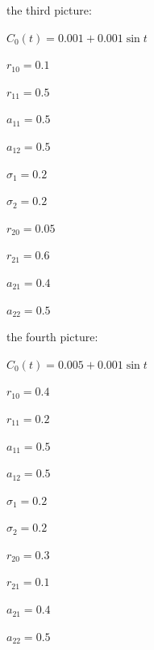 the third picture:

$C_{0}(t)=0.001+0.001\sin t$

\begin{multicols}{5}
    $r_{10}=0.1$
    
    $r_{11}=0.5$
    
    $a_{11}=0.5$
    
    $a_{12}=0.5$
    
    $\sigma_{1}=0.2$

    $\sigma_{2}=0.2$
    
    $r_{20}=0.05$
    
    $r_{21}=0.6$
    
    $a_{21}=0.4$
    
    $a_{22}=0.5$

\end{multicols}

the fourth picture:

$C_{0}(t)=0.005+0.001\sin t$

\begin{multicols}{5}
    $r_{10}=0.4$
    
    $r_{11}=0.2$
    
    $a_{11}=0.5$
    
    $a_{12}=0.5$
    
    $\sigma_{1}=0.2$

    $\sigma_{2}=0.2$
    
    $r_{20}=0.3$
    
    $r_{21}=0.1$
    
    $a_{21}=0.4$
    
    $a_{22}=0.5$

\end{multicols}
